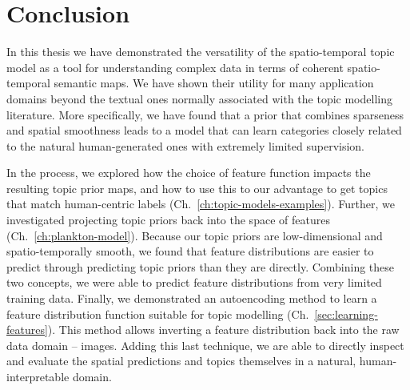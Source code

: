
\chapter{Conclusion} \label{ch:conclusion}

In this thesis we have demonstrated the versatility of the spatio-temporal topic model as a tool for understanding complex data in terms of coherent spatio-temporal semantic maps. We have shown their utility for many application domains beyond the textual ones normally associated with the topic modelling literature. More specifically, we have found that a prior that combines sparseness and spatial smoothness leads to a model that can learn categories closely related to the natural human-generated ones with extremely limited supervision.

In the process, we explored how the choice of feature function impacts the resulting topic prior maps, and how to use this to our advantage to get topics that match human-centric labels (Ch.~\ref{ch:topic-models-examples}). Further, we investigated projecting topic priors back into the space of features (Ch.~\ref{ch:plankton-model}). Because our topic priors are low-dimensional and spatio-temporally smooth, we found that feature distributions are easier to predict through predicting topic priors than they are directly. Combining these two concepts, we were able to predict feature distributions from very limited training data. Finally,
we demonstrated an autoencoding method to learn a feature distribution function suitable for topic modelling (Ch.~\ref{sec:learning-features}). This method allows inverting a feature distribution back into the raw data domain -- images. Adding this last technique, we are able to directly inspect and evaluate the spatial predictions and topics themselves in a natural, human-interpretable domain.

